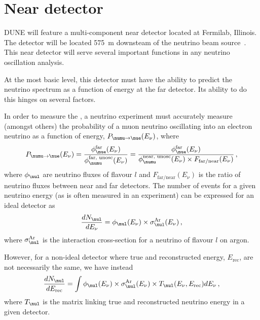 
\section{Near detector}
\label{sec:dune:nd}

DUNE will feature a multi-component near detector located at Fermilab, Illinois.
The detector will be located \SI{575}{\metre} downsteam of the neutrino beam source~\cite{tdrVol1}.
This near detector will serve several important functions in any neutrino oscillation analysis.

At the most basic level, this detector must have the ability to predict the neutrino spectrum as a function of energy at the far detector.
Its ability to do this hinges on several factors.

In order to measure the \dcp, a neutrino experiment must accurately measure (amongst others) the probability of a muon neutrino oscillating into an electron neutrino as a function of energy, $P_{\numu\rightarrow\nue} (E_{\nu})$, where
\begin{equation}
  P_{\numu\rightarrow\nue} (E_{\nu}) = \frac{ \phi^{\text{far}}_{\nue} (E_{\nu}) }{ \phi^{\text{far, unosc}}_{\numu} (E_{\nu}) } = \frac{ \phi^{\text{far}}_{\nue} (E_{\nu}) }{ \phi^{\text{near, unosc}}_{\numu} (E_{\nu}) \times F_{\text{far/near}}(E_{\nu}) }\, ,
\end{equation}
where $\phi_{\nul}$ are neutrino fluxes of flavour $l$ and $F_{\text{far/near}}(E_{\nu})$ is the ratio of neutrino fluxes between near and far detectors.
The number of events for a given neutrino energy (as is often measured in an experiment) can be expressed for an ideal detector as
\begin{equation}
  \frac{ dN_{\nul} }{ dE_{\nu} } = \phi_{\nul}(E_{\nu}) \times \sigma^{\text{Ar}}_{\nul} (E_{\nu})\, ,
\end{equation}
where $\sigma^{\text{Ar}}_{\nul}$ is the interaction cross-section for a neutrino of flavour $l$ on argon.

However, for a non-ideal detector where true and reconstructed energy, $E_{\text{rec}}$, are not necessarily the same, we have instead
\begin{equation}
  \frac{ dN_{\nul} }{ dE_{\text{rec}} } = \int \phi_{\nul}(E_{\nu}) \times \sigma_{\nul}^{\text{Ar}} (E_{\nu}) \times T_{\nul}(E_{\nu},E_{\text{rec}}) dE_{\nu} \, ,
  \label{eq:eventRateConv}
\end{equation}
where $T_{\nul}$ is the matrix linking true and reconstructed neutrino energy in a given detector.


